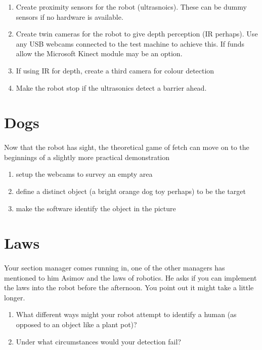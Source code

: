 \documentclass[11pt]{book}
\begin{document}
\begin{enumerate}
\item Create proximity sensors for the robot (ultrasnoics). These can be dummy sensors if no hardware is available.
\item Create twin cameras for the robot to give depth perception (IR perhaps). Use any USB webcams connected to the test machine to achieve this. If funds allow the Microsoft Kinect module may be an option.
\item If using IR for depth, create a third camera for colour detection
\item Make the robot stop if the ultrasonics detect a barrier ahead.
\end{enumerate}

\clearpage

\section{Dogs}

\paragraph{} Now that the robot has sight, the theoretical game of fetch can move on to the beginnings of a slightly more practical demonstration

\begin{enumerate}
\item setup the webcams to survey an empty area
\item define a distinct object (a bright orange dog toy perhaps) to be the target
\item make the software identify the object in the picture
\end{enumerate}

\clearpage

\section{Laws}

\paragraph{} Your section manager comes running in, one of the other managers has mentioned to him Asimov and the laws of robotics. He asks if you can implement the laws into the robot before the afternoon. You point out it might take a little longer.

\begin{enumerate}
\item What different ways might your robot attempt to identify a human (as opposed to an object like a plant pot)?
\item Under what circumstances would your detection fail?
\end{enumerate}
\end{document}
